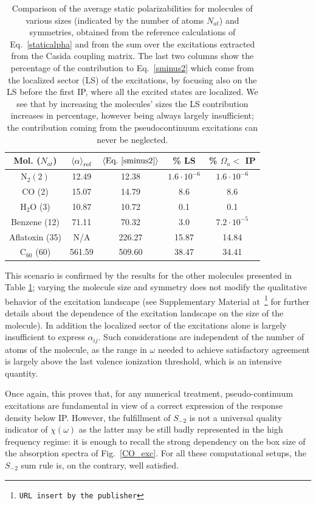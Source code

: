 \documentclass[reprint,aps,prb]{revtex4-1}
\begin{document}
\begin{table}
\begin{tabular}{c|cc||cc}
  Mol. ($N_{at}$) & $\braket{\alpha}_\text{ref}$ & $ \braket{\text{Eq.~\eqref{sminus2}}}$ & \% LS & \% $\Omega_a <$ IP  \\
  \hline
  \hline
  N$_2 (2)$ &12.49 & 12.38 & $1.6\cdot 10^{-6}$ & $1.6\cdot 10^{-6}$ \\
  CO (2)& 15.07 & 14.79 & 8.6 & 8.6 \\
  H$_2$O (3) & 10.87 & 10.72 & 0.1 & 0.1 \\
  Benzene (12)& 71.11 & 70.32 & 3.0 & $7.2 \cdot 10^{-5}$\\
  Aflatoxin (35)& N/A   & 226.27 & 15.87 & 14.84 \\
  C$_{60}$ (60)& 561.59 & 509.60 & 38.47 & 34.41
\end{tabular}\caption{Comparison of the average static polarizabilities for molecules of various sizes (indicated by the number of atoms $N_{at}$) and symmetries, obtained from the reference calculations of Eq.~\eqref{staticalpha} and from the sum over the excitations extracted from the Casida coupling matrix. The last two columns show the percentage of the contribution to Eq.~\eqref{sminus2} which
come from the localized sector (LS) of the excitations, by focusing also on the LS before the first IP, where all the excited states are localized. We see that by increasing the molecules' sizes the LS contribution increases in percentage, however being always largely insufficient; the contribution coming from the pseudocontinuum excitations can never be neglected.}
\label{alphaTable}
\end{table}

This scenario is confirmed by the results for the other molecules presented in Table \ref{alphaTable}; varying the molecule size
and symmetry does not modify the qualitative behavior of the excitation landscape (see Supplementary Material at~\footnote{\texttt{URL insert by the publisher}} for further details about the dependence of the excitation landscape on the size of the molecule).
In addition the localized sector of the excitations alone is largely insufficient to express $\alpha_{ij}$. Such considerations
are independent of the number of atoms of the molecule, as the range in $\omega$ needed to achieve satisfactory agreement is largely above the last valence ionization threshold, which is an intensive quantity.

Once again, this proves that, for any numerical treatment,  pseudo-continuum excitations are fundamental in view of a correct expression
of the response density below IP.
However, the fulfillment of $S_{-2}$ is not a universal quality indicator of $\chi(\omega)$ as the latter may be still badly represented in the high frequency regime:
it is enough to recall
the strong dependency on the box size of the absorption spectra of Fig.~\ref{CO_exc}.
For all these computational setups, the $S_{-2}$ sum rule is, on the contrary, well satisfied.
\end{document}
